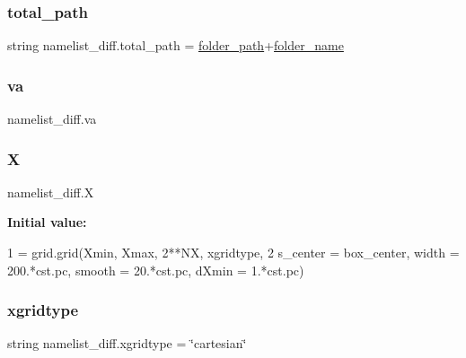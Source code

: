 \subsubsection{\texorpdfstring{total\+\_\+path}{total\_path}}
{\footnotesize\ttfamily string namelist\+\_\+diff.\+total\+\_\+path = \hyperlink{namespacenamelist__diff_aaa5e2a88407b65c86c9af2720dc4c0d1}{folder\+\_\+path}+\hyperlink{namespacenamelist__diff_ab0429c76e7ec948becd63466be73bff5}{folder\+\_\+name}}

\mbox{\label{namespacenamelist__diff_ae868ad5aad9a98fc02ad19342fb85b6d}} 
\subsubsection{\texorpdfstring{va}{va}}
{\footnotesize\ttfamily namelist\+\_\+diff.\+va}

\mbox{\label{namespacenamelist__diff_a505a3f4494135f50650249f1f2fb9590}} 
\subsubsection{\texorpdfstring{X}{X}}
{\footnotesize\ttfamily namelist\+\_\+diff.\+X}

{\bfseries Initial value\+:}
\begin{DoxyCode}
1 =  grid.grid(Xmin, Xmax, 2**NX, xgridtype, 
2               s\_center = box\_center, width = 200.*cst.pc, smooth = 20.*cst.pc, dXmin = 1.*cst.pc)
\end{DoxyCode}
\mbox{\label{namespacenamelist__diff_a811169548b607be0676fe9fe1dd05f55}} 
\subsubsection{\texorpdfstring{xgridtype}{xgridtype}}
{\footnotesize\ttfamily string namelist\+\_\+diff.\+xgridtype = \char`\"{}cartesian\char`\"{}}

\mbox{\label{namespacenamelist__diff_acd1f2896b75256651964cfb8da56a2cb}} 
